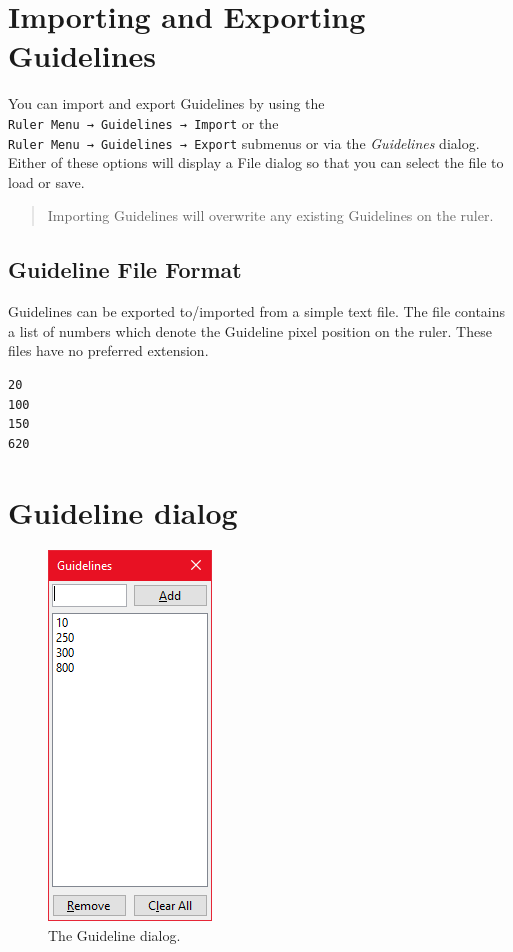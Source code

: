 \documentclass[
]{book}
\begin{document}
\section{Importing and Exporting Guidelines}\label{importing-and-exporting-guidelines}

You can import and export Guidelines by using the \texttt{Ruler\ Menu\ →\ Guidelines\ →\ Import} or the \texttt{Ruler\ Menu\ →\ Guidelines\ →\ Export} submenus or via the \emph{Guidelines} dialog.
Either of these options will display a File dialog so that you can select the file to load or save.

\begin{quote}
Importing Guidelines will overwrite any existing Guidelines on the ruler.
\end{quote}

\subsection{Guideline File Format}\label{guideline-file-format}

Guidelines can be exported to/imported from a simple text file.
The file contains a list of numbers which denote the Guideline pixel position on the ruler.
These files have no preferred extension.

\begin{verbatim}
20
100
150
620
\end{verbatim}

\section{Guideline dialog}\label{guideline-dialog}

\begin{figure}
\centering
\includegraphics{images/guideline-dialog.png}
\caption{\label{fig:unnamed-chunk-3}The Guideline dialog.}
\end{figure}
\end{document}
